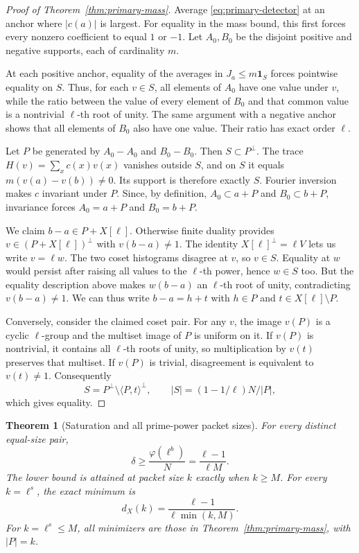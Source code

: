 \documentclass[11pt]{article}
\newtheorem{theorem}{Theorem}[section]
\theoremstyle{definition}
\theoremstyle{remark}
\begin{document}
\begin{proof}[Proof of Theorem~\ref{thm:primary-mass}]
Average \eqref{eq:primary-detector} at an anchor where $|c(a)|$ is
largest.  For equality in the mass bound, this first forces every
nonzero coefficient to equal $1$ or $-1$.  Let $A_0,B_0$ be the disjoint
positive and negative supports, each of cardinality $m$.

At each positive anchor, equality of the averages in
$J_a\le m\mathbf1_S$ forces pointwise equality on $S$.  Thus, for each
$v\in S$, all elements of $A_0$ have one value under $v$, while the ratio between the value of every
element of $B_0$ and that common value is a nontrivial $\ell$-th root of unity.  The same
argument with a negative anchor shows that all elements of $B_0$ also
have one value.  Their ratio has exact order $\ell$.

Let $P$ be generated by $A_0-A_0$ and $B_0-B_0$.  Then $S\subset P^\perp$.
The trace $H(v)=\sum_xc(x)v(x)$ vanishes outside $S$, and on $S$ it equals
$m(v(a)-v(b))\ne0$.  Its support is therefore exactly $S$.
Fourier inversion makes $c$ invariant under $P$.  Since, by definition,
$A_0\subset a+P$ and $B_0\subset b+P$, invariance forces
$A_0=a+P$ and $B_0=b+P$.

We claim $b-a\in P+X[\ell]$.  Otherwise finite duality provides
$v\in(P+X[\ell])^\perp$ with $v(b-a)\ne1$.  The identity
$X[\ell]^\perp=\ell V$ lets us write $v=\ell w$.  The two coset
histograms disagree at $v$, so $v\in S$.  Equality at $w$ would persist
after raising all values to the $\ell$-th power, hence $w\in S$ too.
But the equality description above makes $w(b-a)$ an $\ell$-th root of
unity, contradicting $v(b-a)\ne1$.  We can thus write $b-a=h+t$ with
$h\in P$ and $t\in X[\ell]\setminus P$.

Conversely, consider the claimed coset pair.  For any $v$, the image
$v(P)$ is a cyclic $\ell$-group and the multiset image of $P$ is uniform
on it.  If $v(P)$ is nontrivial, it contains all $\ell$-th roots of unity,
so multiplication by $v(t)$ preserves that multiset.  If $v(P)$ is
trivial, disagreement is equivalent to $v(t)\ne1$.  Consequently
\[
 S=P^\perp\setminus\langle P,t\rangle^\perp,
 \qquad |S|=(1-1/\ell)N/|P|,
\]
which gives equality.
\end{proof}

\begin{theorem}[Saturation and all prime-power packet sizes]
\label{thm:primary-saturation}
For every distinct equal-size pair,
\[
 \delta\ge\frac{\varphi(\ell^b)}N
            =\frac{\ell-1}{\ell M}.
\]
The lower bound is attained at packet size $k$ exactly when $k\ge M$.
For every $k=\ell^s$, the exact minimum is
\[
 \boxed{\displaystyle d_X(k)=
       \frac{\ell-1}{\ell\min(k,M)}.}
\]
For $k=\ell^s\le M$, all minimizers are those in
Theorem~\ref{thm:primary-mass}, with $|P|=k$.
\end{theorem}
\end{document}
